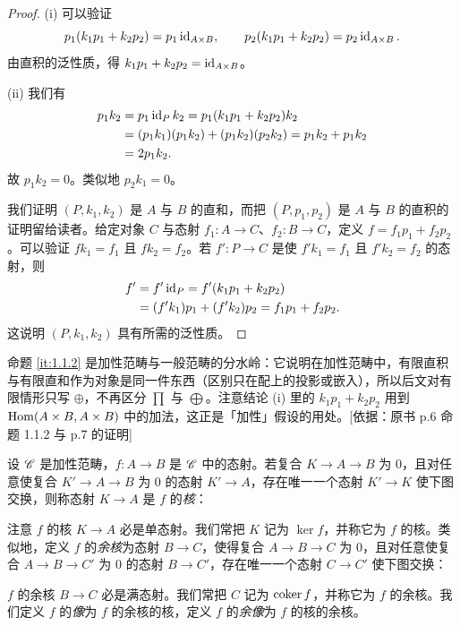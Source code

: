 \begin{proof}
(i) 可以验证
\[
p_1(k_1p_1+k_2p_2)=p_1\operatorname{id}_{A\times B},\qquad
p_2(k_1p_1+k_2p_2)=p_2\operatorname{id}_{A\times B}.
\]
由直积的泛性质，得 $k_1p_1+k_2p_2=\operatorname{id}_{A\times B}$。

(ii) 我们有
\begin{align*}
p_1k_2&=p_1\operatorname{id}_Pk_2=p_1(k_1p_1+k_2p_2)k_2\\
&=(p_1k_1)(p_1k_2)+(p_1k_2)(p_2k_2)=p_1k_2+p_1k_2\\
&=2p_1k_2.
\end{align*}
故 $p_1k_2=0$。类似地 $p_2k_1=0$。

我们证明 $(P,k_1,k_2)$ 是 $A$ 与 $B$ 的直和，而把 $(P,p_1,p_2)$ 是 $A$ 与 $B$ 的直积的证明留给读者。给定对象 $C$ 与态射 $f_1\colon A\to C$、$f_2\colon B\to C$，定义 $f=f_1p_1+f_2p_2$。可以验证 $fk_1=f_1$ 且 $fk_2=f_2$。若 $f'\colon P\to C$ 是使 $f'k_1=f_1$ 且 $f'k_2=f_2$ 的态射，则
\begin{align*}
f'&=f'\operatorname{id}_P=f'(k_1p_1+k_2p_2)\\
&=(f'k_1)p_1+(f'k_2)p_2=f_1p_1+f_2p_2.
\end{align*}
这说明 $(P,k_1,k_2)$ 具有所需的泛性质。
\end{proof}
\begin{tnote}
命题 \ref{it:1.1.2} 是加性范畴与一般范畴的分水岭：它说明在加性范畴中，有限直积与有限直和作为对象是同一件东西（区别只在配上的投影或嵌入），所以后文对有限情形只写 $\oplus$，不再区分 $\prod$ 与 $\bigoplus$。注意结论 (i) 里的 $k_1p_1+k_2p_2$ 用到 $\operatorname{Hom}(A\times B,A\times B)$ 中的加法，这正是「加性」假设的用处。[依据：原书 p.6 命题 1.1.2 与 p.7 的证明]
\end{tnote}

设 $\mathscr{C}$ 是加性范畴，$f\colon A\to B$ 是 $\mathscr{C}$ 中的态射。若复合 $K\to A\to B$ 为 $0$，且对任意使复合 $K'\to A\to B$ 为 $0$ 的态射 $K'\to A$，存在唯一一个态射 $K'\to K$ 使下图交换，则称态射 $K\to A$ 是 $f$ 的\emph{核}：
\begin{center}
\end{center}
注意 $f$ 的核 $K\to A$ 必是单态射。我们常把 $K$ 记为 $\ker f$，并称它为 $f$ 的核。类似地，定义 $f$ 的\emph{余核}为态射 $B\to C$，使得复合 $A\to B\to C$ 为 $0$，且对任意使复合 $A\to B\to C'$ 为 $0$ 的态射 $B\to C'$，存在唯一一个态射 $C\to C'$ 使下图交换：
\begin{center}
\end{center}
$f$ 的余核 $B\to C$ 必是满态射。我们常把 $C$ 记为 $\operatorname{coker} f$，并称它为 $f$ 的余核。我们定义 $f$ 的\emph{像}为 $f$ 的余核的核，定义 $f$ 的\emph{余像}为 $f$ 的核的余核。

